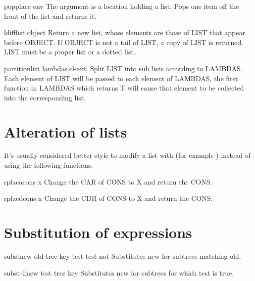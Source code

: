 \documentclass[10pt,english]{book}
\begin{document}
\begin{macro}{pop}{place \env env}
  The argument is a location holding a list. Pops one item off the front
  of the list and returns it.
\end{macro}

\begin{function}{ldiff}{list object}
  Return a new list, whose elements are those of LIST that appear before
   OBJECT. If OBJECT is not a tail of LIST, a copy of LIST is returned.
   LIST must be a proper list or a dotted list.
\end{function}

\begin{function}{partition}{list \rest lambdas}[cl-ext]
  Split LIST into sub lists according to LAMBDAS. Each element of LIST
  will be passed to each element of LAMBDAS, the first function in
  LAMBDAS which returns T will cause that element to be collected into
  the corresponding list.
\end{function}

\section{Alteration of lists}
\label{sec:alteration-lists}

It's usually considered better style to modify a list with
 (for example ) instead of
using the following functions.

\begin{function}{rplaca}{cons x}
  Change the CAR of CONS to X and return the CONS.
\end{function}

\begin{function}{rplacd}{cons x}
  Change the CDR of CONS to X and return the CONS.
\end{function}

\section{Substitution of expressions}
\label{sec:subst-expr}

\begin{function}{subst}{new old tree \key key test test-not}
  Substitutes new for subtrees matching old.
\end{function}

\begin{function}{subst-if}{new test tree \key key}
  Substitutes new for subtrees for which test is true.
\end{function}
\end{document}
